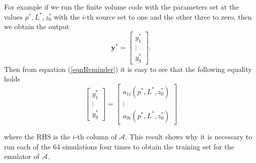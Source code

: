 \documentclass{sfuthesis}
\newcommand{\y}{\textbf{y}}
\begin{document}
For example if we run the finite volume code with the parameters set at the values
$p^{*},L^{*},z_{0}^{*}$ with the $i$-th source set to one and the other 
three to zero, then we obtain the output
\begin{equation*}
\y^{*}=\begin{bmatrix}
y_{1}^{*}\\
\vdots\\
y_{9}^{*}
\end{bmatrix}.
\end{equation*}
Then from equation (\ref{eqnReminder}) it is easy to see that 
the following equality holds
\begin{equation*}
\begin{bmatrix}
y_{1}^{*}\\
\vdots\\
y_{9}^{*}
\end{bmatrix}=\begin{bmatrix}
a_{1i}(p^{*},L^{*},z_{0}^{*})\\
\vdots\\
a_{9i}(p^{*},L^{*},z_{0}^{*})
\end{bmatrix}
\end{equation*}

\noindent where the RHS is the $i$-th column of $\mathscr{A}$. This result shows why
it is necessary to run each of the 64 simulations four times to 
obtain the training set for the emulator of $\mathscr{A}$.
\end{document}
